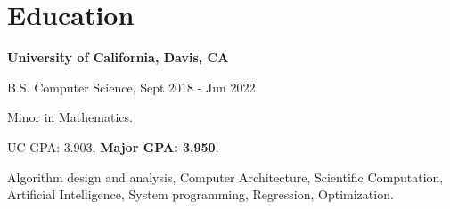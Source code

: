 \section{\sc Education}

{\bf University of California, Davis, CA}\\
\vspace*{-.1in}
\begin{list1}
\item[] B.S. Computer Science, Sept 2018 - Jun 2022
\begin{list2}
\vspace*{.05in}
\item Minor in Mathematics.
\item UC GPA: 3.903, \textbf{Major GPA: 3.950}.
\item Algorithm design and analysis, Computer Architecture, Scientific Computation, Artificial Intelligence, System programming, Regression, Optimization. 
\end{list2}
\end{list1}


\endinput